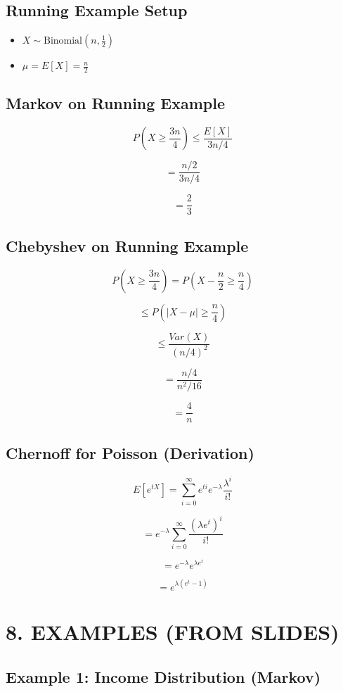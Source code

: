 \documentclass[12pt]{article}
\begin{document}
\subsection*{Running Example Setup}

\begin{itemize}
\item $X \sim \text{Binomial}(n, \tfrac{1}{2})$
\item $\mu = E[X] = \tfrac{n}{2}$
\end{itemize}

\subsection*{Markov on Running Example}

\[
P\left(X \ge \frac{3n}{4}\right) \le \frac{E[X]}{3n/4}
\]

\[
= \frac{n/2}{3n/4}
\]

\[
= \frac{2}{3}
\]

\subsection*{Chebyshev on Running Example}

\[
P\left(X \ge \frac{3n}{4}\right)
= P\left(X - \frac{n}{2} \ge \frac{n}{4}\right)
\]

\[
\le P\left(|X - \mu| \ge \frac{n}{4}\right)
\]

\[
\le \frac{Var(X)}{(n/4)^2}
\]

\[
= \frac{n/4}{n^2/16}
\]

\[
= \frac{4}{n}
\]

\subsection*{Chernoff for Poisson (Derivation)}

\[
E[e^{tX}] = \sum_{i=0}^{\infty} e^{ti} e^{-\lambda} \frac{\lambda^i}{i!}
\]

\[
= e^{-\lambda} \sum_{i=0}^{\infty} \frac{(\lambda e^t)^i}{i!}
\]

\[
= e^{-\lambda} e^{\lambda e^t}
\]

\[
= e^{\lambda(e^t - 1)}
\]

\section*{8. EXAMPLES (FROM SLIDES)}

\subsection*{Example 1: Income Distribution (Markov)}
\end{document}
